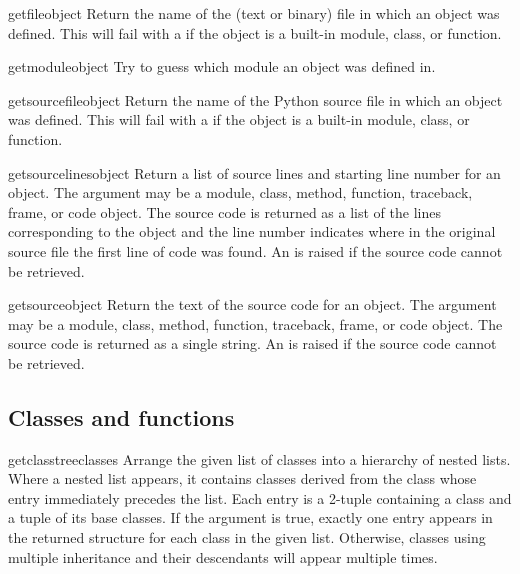 \begin{funcdesc}{getfile}{object}
  Return the name of the (text or binary) file in which an object was
  defined.  This will fail with a  if the object
  is a built-in module, class, or function.
\end{funcdesc}

\begin{funcdesc}{getmodule}{object}
  Try to guess which module an object was defined in.
\end{funcdesc}

\begin{funcdesc}{getsourcefile}{object}
  Return the name of the Python source file in which an object was
  defined.  This will fail with a  if the object
  is a built-in module, class, or function.
\end{funcdesc}

\begin{funcdesc}{getsourcelines}{object}
  Return a list of source lines and starting line number for an object.
  The argument may be a module, class, method, function, traceback, frame,
  or code object.  The source code is returned as a list of the lines
  corresponding to the object and the line number indicates where in the
  original source file the first line of code was found.  An
   is raised if the source code cannot be retrieved.
\end{funcdesc}

\begin{funcdesc}{getsource}{object}
  Return the text of the source code for an object.
  The argument may be a module, class, method, function, traceback, frame,
  or code object.  The source code is returned as a single string.  An
   is raised if the source code cannot be retrieved.
\end{funcdesc}

\subsection{Classes and functions
            \label{inspect-classes-functions}}

\begin{funcdesc}{getclasstree}{classes}
  Arrange the given list of classes into a hierarchy of nested lists.
  Where a nested list appears, it contains classes derived from the class
  whose entry immediately precedes the list.  Each entry is a 2-tuple
  containing a class and a tuple of its base classes.  If the 
  argument is true, exactly one entry appears in the returned structure
  for each class in the given list.  Otherwise, classes using multiple
  inheritance and their descendants will appear multiple times.
\end{funcdesc}

